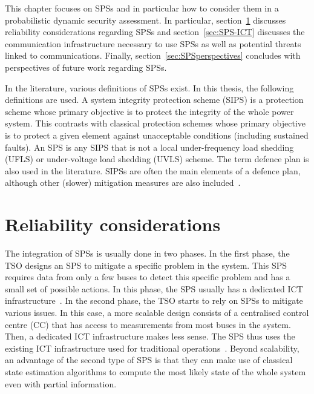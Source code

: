 This chapter focuses on SPSs and in particular how to consider them in a probabilistic dynamic security assessment. In particular, section~\ref{sec:SPSreliability} discusses reliability considerations regarding SPSs and section~\ref{sec:SPS-ICT} discusses the communication infrastructure necessary to use SPSs as well as potential threats linked to communications. Finally, section~\ref{sec:SPSperspectives} concludes with perspectives of future work regarding SPSs.

In the literature, various definitions of SPSs exist. In this thesis, the following definitions are used. A system integrity protection scheme (SIPS) is a protection scheme whose primary objective is to protect the integrity of the whole power system. This contrasts with classical protection schemes whose primary objective is to protect a given element against unacceptable conditions (including sustained faults). An SPS is any SIPS that is not a local under-frequency load shedding (UFLS) or under-voltage load shedding (UVLS) scheme. The term defence plan is also used in the literature. SIPSs are often the main elements of a defence plan, although other (slower) mitigation measures are also included~\cite{CigreDefensePlan, ENTSOEdefencePlan}.

\section{Reliability considerations}
\label{sec:SPSreliability}

The integration of SPSs is usually done in two phases. In the first phase, the TSO designs an SPS to mitigate a specific problem in the system. This SPS requires data from only a few buses to detect this specific problem and has a small set of possible actions. In this phase, the SPS usually has a dedicated ICT infrastructure~\cite{BelgiumSPS}. In the second phase, the TSO starts to rely on SPSs to mitigate various issues. In this case, a more scalable design consists of a centralised control centre (CC) that has access to measurements from most buses in the system. Then, a dedicated ICT infrastructure makes less sense. The SPS thus uses the existing ICT infrastructure used for traditional operations~\cite{GeorgiaSPS, UruguaySPS}. Beyond scalability, an advantage of the second type of SPS is that they can make use of classical state estimation algorithms to compute the most likely state of the whole system even with partial information.

